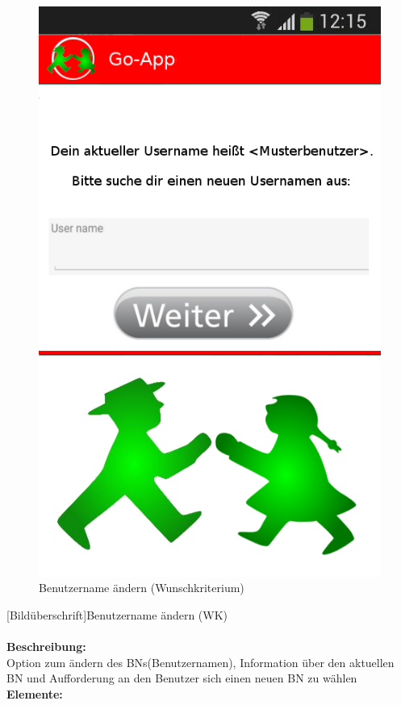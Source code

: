 \begin{figure} [H]
	\caption{Benutzername ändern (Wunschkriterium)}
\begin{center}
	\includegraphics[scale =0.5]{resources/images/username_aendern.png}
\end{center}
\end{figure}
[Bildüberschrift]Benutzername ändern (WK)\\ \\
\textbf{Beschreibung:}\\
Option zum ändern des BNs(Benutzernamen), Information über den aktuellen BN und Aufforderung an den Benutzer sich einen neuen BN zu wählen\\
\textbf{Elemente:}\\
